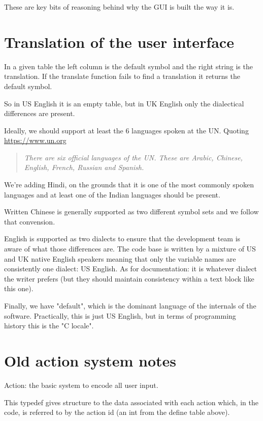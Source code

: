 These are key bits of reasoning behind why the GUI is built the way it is.

\section{Translation of the user interface}

In a given table the left column is the default symbol and the right string is the translation.
If the translate function fails to find a translation it returns the default symbol.

So in US English it is an empty table, but in UK English
only the dialectical differences are present.

Ideally, we should support at least the 6 languages spoken at the UN. Quoting \url{https://www.un.org}

\begin{quote}
\emph{There are six official languages of the UN. These are Arabic, Chinese, English, French, Russian and Spanish.}
\end{quote}

We're adding Hindi, on the grounds that it is one of the most commonly spoken languages and at
least one of the Indian languages should be present.

Written Chinese is generally supported as two different symbol sets and we follow that
convension.

English is supported as two dialects to ensure that the development team is aware of what those
differences are. The code base is written by a mixture of US and UK native English speakers
meaning that only the variable names are consistently one dialect: US English. As for
documentation: it is whatever dialect the writer prefers (but they should maintain consistency
within a text block like this one).

Finally, we have "default", which is the dominant language
of the internals of the software. Practically, this is
just US English, but in terms of programming history this
is the "C locale".

\section{Old action system notes}

Action: the basic system to encode all user input.

This typedef gives structure to the data associated with each action
which, in the code, is referred to by the action id (an int from
the define table above).

